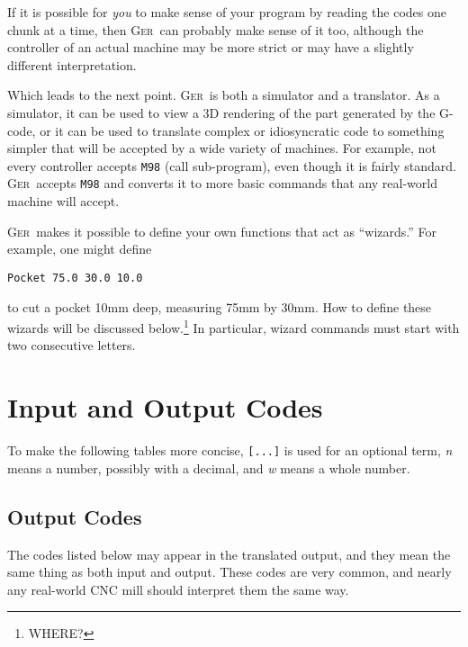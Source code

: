 \documentclass[titlepage,oneside,10pt]{article}
\newcommand{\ger}{\textsc{Ger}}
\begin{document}
If it is possible for \emph{you} to make sense of your program by 
reading the codes one chunk at a time, then \ger\ can probably make
sense of it too, although the controller of an actual machine may be
more strict or may have a slightly different interpretation.

Which leads to the next point. \ger\ is both a simulator and a
translator. As a simulator, it can be used to view a 3D rendering of
the part generated by the G-code, or it can be used to translate complex or
idiosyncratic code to something simpler that will be accepted by a
wide variety of machines. For example, not every controller accepts
{\tt M98} (call sub-program), even though it is fairly
standard. \ger\ accepts {\tt M98} and converts it to more basic
commands that any real-world machine will accept.

\ger\ makes it possible to define your own functions that act as
``wizards.'' For example, one might define
\begin{verbatim}
Pocket 75.0 30.0 10.0 
\end{verbatim}
to cut a pocket 10mm deep, measuring 75mm by 30mm. How to define these
wizards will be discussed below.\footnote{WHERE?} In particular, wizard
commands must start with two consecutive letters.

\section{Input and Output Codes}

To make the following tables more concise, {\tt [...]} is used for an
optional term, \emph{n} means a number, possibly with a decimal, and
\emph{w} means a whole number. 

\subsection{Output Codes}

The codes listed below may appear in the translated output, and they
mean the same thing as both input and output. These codes are very
common, and nearly any real-world CNC mill should interpret them the
same way. 
\end{document}
